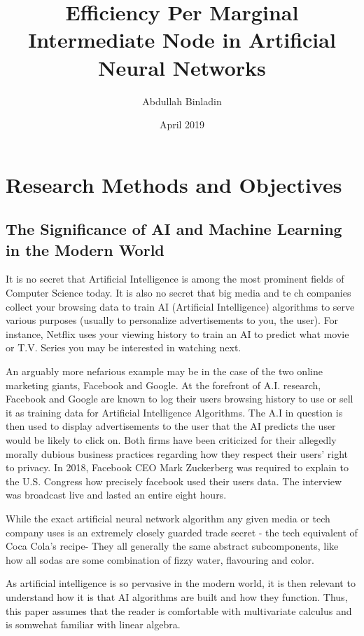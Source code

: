 \documentclass[12pt]{article}
\title{Efficiency Per Marginal Intermediate Node in Artificial Neural Networks}
\author{Abdullah Binladin}
\date{April 2019}
\begin{document}
\maketitle


\section{Research Methods and Objectives}

    \subsection{The Significance of AI and Machine Learning in the Modern World \label{history}}

        It is no secret that Artificial Intelligence is among the most prominent fields of Computer Science today. It is also no secret that big media and te
        ch companies collect your browsing data to train AI (Artificial Intelligence) algorithms to serve various purposes (usually to personalize advertisements to you, the user). For instance, Netflix uses your viewing history to train an AI to predict what movie or T.V. Series you may be interested in watching next.

        An arguably more nefarious example may be in the case of the two online marketing giants, Facebook and Google. At the forefront of A.I. research, Facebook and Google are known to log their users browsing history to use or sell it as training data for Artificial Intelligence Algorithms. The A.I in question is then used to display advertisements to the user that the AI predicts the user would be likely to click on. Both firms have been criticized for their allegedly morally dubious business practices regarding how they respect their users' right to privacy. In 2018, Facebook CEO Mark Zuckerberg was required to explain to the U.S. Congress how precisely facebook used their users data. The interview was broadcast live and lasted an entire eight hours.

        While the exact artificial neural network algorithm any given media or tech company uses is an extremely closely guarded trade secret - the tech equivalent of Coca Cola's recipe- They all generally the same abstract subcomponents, like how all sodas are some combination of fizzy water, flavouring and color.

        As artificial intelligence is so pervasive in the modern world, it is then relevant to understand how it is that AI algorithms are built and how they function. Thus, this paper assumes that the reader is comfortable with multivariate calculus and is somwehat familiar with linear algebra.
\end{document}
